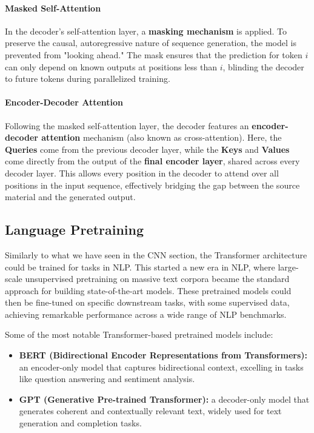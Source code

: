 \paragraph{Masked Self-Attention}
In the decoder's self-attention layer, a \textbf{masking mechanism} is applied. To preserve the causal, autoregressive nature of sequence generation, the model is prevented from "looking ahead." The mask ensures that the prediction for token $i$ can only depend on known outputs at positions less than $i$, blinding the decoder to future tokens during parallelized training.

\paragraph{Encoder-Decoder Attention}
Following the masked self-attention layer, the decoder features an \textbf{encoder-decoder attention} mechanism (also known as cross-attention). 
Here, the \textbf{Queries} come from the previous decoder layer, while the \textbf{Keys} and \textbf{Values} come directly from the output of the \textbf{final encoder layer}, shared across every decoder layer. This allows every position in the decoder to attend over all positions in the input sequence, effectively bridging the gap between the source material and the generated output.

\subsection{Language Pretraining}
Similarly to what we have seen in the CNN section, the Transformer architecture could be trained for tasks in NLP.
This started a new era in NLP, where large-scale unsupervised pretraining on massive text corpora became the standard approach for building state-of-the-art models.
These pretrained models could then be fine-tuned on specific downstream tasks, with some supervised data, achieving remarkable performance across a wide range of NLP benchmarks.

Some of the most notable Transformer-based pretrained models include:
\begin{itemize}
    \item \textbf{BERT (Bidirectional Encoder Representations from Transformers):} an encoder-only model that captures bidirectional context, excelling in tasks like question answering and sentiment analysis.
    \item \textbf{GPT (Generative Pre-trained Transformer):} a decoder-only model that generates coherent and contextually relevant text, widely used for text generation and completion tasks.
\end{itemize}

